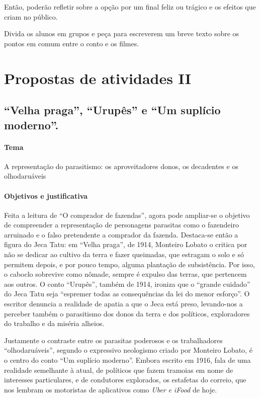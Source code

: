 \documentclass[11pt]{extarticle}
\begin{document}
Então, poderão refletir sobre a opção por um final feliz ou
trágico e os efeitos que criam no público.

Divida os alunos em grupos e peça para escreverem 
um breve texto sobre os pontos em comum entre o 
conto e os filmes.

\section{Propostas de atividades II}
\subsection{``Velha praga'', ``Urupês'' e ``Um suplício moderno''.}

\paragraph{Tema} A representação do parasitismo: os aproveitadores donos, os decadentes e
os olhodaruáveis

\paragraph{Objetivos e justificativa}
Feita a leitura de ``O comprador de fazendas'', agora pode ampliar-se o
objetivo de compreender a representação de personagens parasitas como o
fazendeiro arruinado e o falso pretendente a comprador da fazenda.
Destaca-se então a figura do Jeca Tatu: em ``Velha praga'', de 1914,
Monteiro Lobato o critica por não se dedicar ao cultivo da terra e fazer
queimadas, que estragam o solo e só permitem depois, e por pouco tempo,
alguma plantação de subsistência. Por isso, o caboclo sobrevive como
nômade, sempre é expulso das terras, que pertencem aos outros. O conto
``Urupês'', também de 1914, ironiza que o ``grande cuidado'' do Jeca
Tatu seja ``espremer todas as consequências da lei do menor esforço''. O
escritor denuncia a realidade de apatia a que o Jeca está preso,
levando-nos a perceber também o parasitismo dos donos da terra e dos
políticos, exploradores do trabalho e da miséria alheios.


Justamente o contraste entre os parasitas poderosos e os trabalhadores
``olhodaruáveis'', segundo o expressivo neologismo criado por Monteiro
Lobato, é o centro do conto ``Um suplício moderno''. Embora escrito em
1916, fala de uma realidade semelhante à atual, de políticos que fazem
tramoias em nome de interesses particulares, e de condutores explorados,
os estafetas do correio, que nos lembram os motoristas de aplicativos
como \emph{Uber} \emph{e iFood} de hoje.
\end{document}
